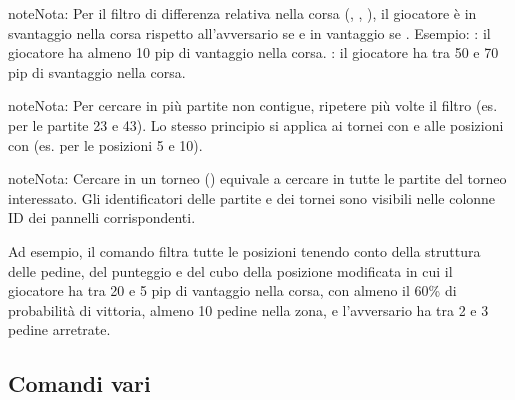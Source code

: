 \documentclass[letterpaper,10pt,italian]{sphinxmanual}
\begin{document}
\begin{sphinxadmonition}{note}{Nota:}
\sphinxAtStartPar
Per il filtro di differenza relativa nella corsa (, , ), il giocatore è in svantaggio nella corsa rispetto all’avversario se  e in vantaggio se . Esempio:  : il giocatore ha almeno 10 pip di vantaggio nella corsa.  : il giocatore ha tra 50 e 70 pip di svantaggio nella corsa.
\end{sphinxadmonition}

\begin{sphinxadmonition}{note}{Nota:}
\sphinxAtStartPar
Per cercare in più partite non contigue, ripetere più volte il filtro  (es.  per le partite 23 e 43). Lo stesso principio si applica ai tornei con  e alle posizioni con  (es.  per le posizioni 5 e 10).
\end{sphinxadmonition}

\begin{sphinxadmonition}{note}{Nota:}
\sphinxAtStartPar
Cercare in un torneo () equivale a cercare in tutte le partite del torneo interessato. Gli identificatori delle partite e dei tornei sono visibili nelle colonne ID dei pannelli corrispondenti.
\end{sphinxadmonition}

\sphinxAtStartPar
Ad esempio, il comando  filtra tutte le posizioni tenendo conto della struttura delle pedine, del punteggio e del cubo della posizione modificata in cui il giocatore ha tra 20 e 5 pip di vantaggio nella corsa, con almeno il 60\% di probabilità di vittoria, almeno 10 pedine nella zona, e l’avversario ha tra 2 e 3 pedine arretrate.


\subsection{Comandi vari}
\label{\detokenize{cmd_mode:commandes-diverses}}\label{\detokenize{cmd_mode:cmd-misc}}
\end{document}
